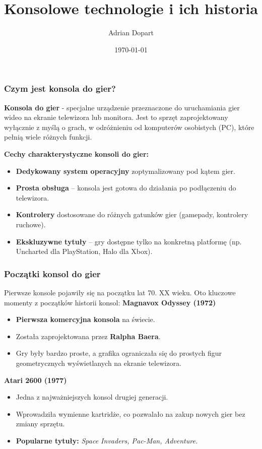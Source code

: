 \documentclass[8pt]{beamer}
\title{Konsolowe technologie i ich historia}
\author{Adrian Dopart}
\date{\today}
\begin{document}
\begin{frame}
    \titlepage
\end{frame}

\begin{frame}
\frametitle{Czym jest konsola do gier?}
\textbf{Konsola do gier} - specjalne urządzenie przeznaczone do uruchamiania gier wideo na ekranie telewizora lub monitora. Jest to sprzęt zaprojektowany wyłącznie z myślą o grach, w odróżnieniu od komputerów osobistych (PC), które pełnią wiele różnych funkcji.

\textbf{Cechy charakterystyczne konsoli do gier:}

\begin{itemize}
\item \textbf{Dedykowany system operacyjny} zoptymalizowany pod kątem gier.
\item \textbf{Prosta obsługa} – konsola jest gotowa do działania po podłączeniu do telewizora.
\item \textbf{Kontrolery} dostosowane do różnych gatunków gier (gamepady, kontrolery ruchowe).
\item \textbf{Ekskluzywne tytuły} – gry dostępne tylko na konkretną platformę (np. Uncharted dla PlayStation, Halo dla Xbox).

\end{itemize}

\end{frame}

\begin{frame}
\frametitle{Początki konsol do gier}
Pierwsze konsole pojawiły się na początku lat 70. XX wieku. Oto kluczowe momenty z początków historii konsol:
\textbf{Magnavox Odyssey (1972)}

\begin{itemize}
\item \textbf {Pierwsza komercyjna konsola} na świecie.
\item Została zaprojektowana przez \textbf{Ralpha Baera}.
\item Gry były bardzo proste, a grafika ograniczała się do prostych figur geometrycznych wyświetlanych na ekranie telewizora.

\end{itemize}

\textbf{Atari 2600 (1977)}
\begin{itemize}
\item Jedna z najważniejszych konsol drugiej generacji.
\item Wprowadziła wymienne kartridże, co pozwalało na zakup nowych gier bez zmiany sprzętu.
\item \textbf {Popularne tytuły:} \textit {Space Invaders, Pac-Man, Adventure.}

\end{itemize}

\end{frame}
\end{document}
